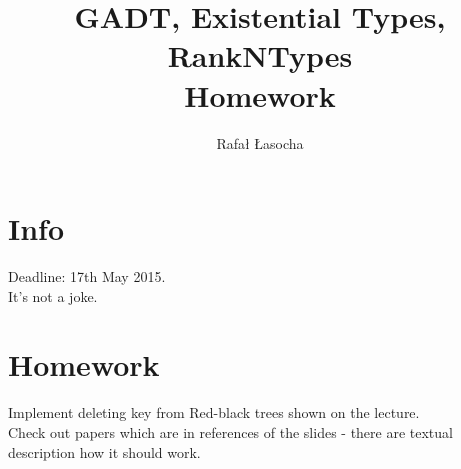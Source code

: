 \documentclass[a4paper,11pt]{article}
\title{
  \textbf{GADT, Existential Types, RankNTypes}\\
  {\Large Homework}
}
\author{Rafał Łasocha}
\begin{document}
\maketitle
\section{Info}
Deadline: 17th May 2015. \\
It's not a joke.

\section{Homework}
Implement deleting key from Red-black trees shown on the lecture. \\
Check out papers which are in references of the slides - there are textual description how it should work.
\end{document}
